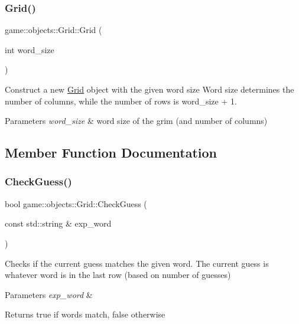 \subsubsection{\texorpdfstring{Grid()}{Grid()}}
{\footnotesize\ttfamily game\+::objects\+::\+Grid\+::\+Grid (\begin{DoxyParamCaption}\item[{int}]{word\+\_\+size }\end{DoxyParamCaption})}



Construct a new \hyperlink{classgame_1_1objects_1_1Grid}{Grid} object with the given word size Word size determines the number of columns, while the number of rows is word\+\_\+size + 1. 


\begin{DoxyParams}{Parameters}
{\em word\+\_\+size} & word size of the grim (and number of columns) \\
\hline
\end{DoxyParams}


\subsection{Member Function Documentation}
\mbox{\label{classgame_1_1objects_1_1Grid_ad1cd48d90e6886a6bde6b1905319d8e5}} 
\subsubsection{\texorpdfstring{Check\+Guess()}{CheckGuess()}}
{\footnotesize\ttfamily bool game\+::objects\+::\+Grid\+::\+Check\+Guess (\begin{DoxyParamCaption}\item[{const std\+::string \&}]{exp\+\_\+word }\end{DoxyParamCaption})}



Checks if the current guess matches the given word. The current guess is whatever word is in the last row (based on number of guesses) 


\begin{DoxyParams}{Parameters}
{\em exp\+\_\+word} & \\
\hline
\end{DoxyParams}
\begin{DoxyReturn}{Returns}
true if words match, false otherwise 
\end{DoxyReturn}
\mbox{\label{classgame_1_1objects_1_1Grid_af54fe43e853745e264a5b9e9b9e8e702}} 
